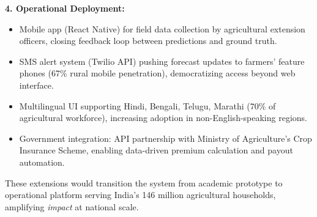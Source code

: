 \documentclass[10pt,a4paper]{article}
\begin{document}
\textbf{4. Operational Deployment:}
\begin{itemize}[leftmargin=*,itemsep=0pt]
\item Mobile app (React Native) for field data collection by agricultural extension officers, closing feedback loop between predictions and ground truth.
\item SMS alert system (Twilio API) pushing forecast updates to farmers' feature phones (67\% rural mobile penetration), democratizing access beyond web interface.
\item Multilingual UI supporting Hindi, Bengali, Telugu, Marathi (70\% of agricultural workforce), increasing adoption in non-English-speaking regions.
\item Government integration: API partnership with Ministry of Agriculture's Crop Insurance Scheme, enabling data-driven premium calculation and payout automation.
\end{itemize}

These extensions would transition the system from academic prototype to operational platform serving India's 146 million agricultural households, amplifying \textit{impact} at national scale.
\end{document}
